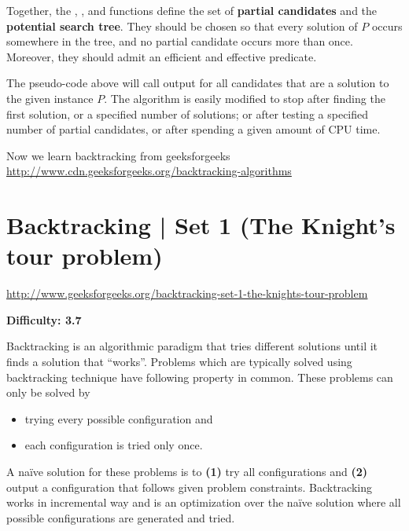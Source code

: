 Together, the , , and  functions define the
set of \textbf{partial candidates} and the \textbf{potential search tree}.
They should be chosen so that every solution of $P$ occurs somewhere in the
tree, and no partial candidate occurs more than once. Moreover, they should
admit an efficient and effective  predicate.


The pseudo-code above will call output for all candidates that are a
solution to the given instance $P$. The algorithm is easily modified to stop
after finding the first solution, or a specified number of solutions; or
after testing a specified number of partial candidates, or after spending a
given amount of CPU time.




\rrsepline{}

Now we learn backtracking from geeksforgeeks
\url{http://www.cdn.geeksforgeeks.org/backtracking-algorithms}


\section{Backtracking | Set 1 (The Knight's tour problem)
  \label{secGFGBktrckSet1KnightsTour}}

\url{http://www.geeksforgeeks.org/backtracking-set-1-the-knights-tour-problem}

\textbf{Difficulty: 3.7}

Backtracking is an algorithmic paradigm that tries different solutions until
it finds a solution that ``works''. Problems which are typically solved
using backtracking technique have following property in common. These
problems can only be solved by 
\begin{itemize}[noitemsep,topsep=0pt]
\item trying every possible configuration and
\item each configuration is tried only once.
\end{itemize}
A na\"ive solution for these problems is to \textbf{(1)} try all
configurations and \textbf{(2)} output a configuration that follows given
problem constraints. Backtracking works in incremental way and is an
optimization over the na\"ive solution where all possible configurations are
generated and tried.

